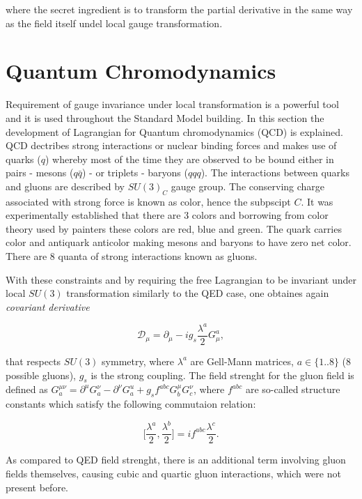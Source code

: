 where the secret ingredient is to transform the partial derivative in the same way as the field itself undel local gauge transformation.

\section{Quantum Chromodynamics}
Requirement of gauge invariance under local transformation is a powerful tool and it is used throughout the Standard Model building. In this section the development of Lagrangian for Quantum chromodynamics (QCD) is explained. QCD dectribes strong interactions or nuclear binding forces and makes use of quarks ($q$) whereby most of the time they are observed to be bound either in pairs - mesons ($q\bar{q}$) - or triplets - baryons ($qqq$). The interactions between quarks and gluons are described by $SU(3)_{C}$ gauge group. The conserving charge associated with strong force is known as color, hence the subpscipt $C$. It was experimentally established that there are 3 colors and borrowing from color theory used by painters these colors are red, blue and green. The quark carries color and antiquark anticolor making mesons and baryons to have zero net color. There are 8 quanta of strong interactions known as gluons.

With these constraints and by requiring the free Lagrangian to be invariant under local $SU(3)$ transformation similarly to the QED case, one obtaines again \textit{covariant derivative}

\begin{equation}
\mathcal{D}_{\mu} = \partial_{\mu} - ig_{s}\frac{\lambda^{a}}{2}G^{a}_{\mu},
\end{equation}

that respects $SU(3)$ symmetry, where $\lambda^{a}$ are Gell-Mann matrices, $a\in\{1..8\}$ (8 possible gluons), $g_{s}$ is the strong coupling. The field strenght for the gluon field is defined as $G_{a}^{\mu\nu}=\partial^{u}G_{a}^{\nu} - \partial^{\nu}G_{a}^{u} + g_{s}f^{abc}G_{b}^{\mu}G_{c}^{\nu}$, where $f^{abc}$ are so-called structure constants which satisfy the following commutaion relation:

\begin{equation}
	\Big[\frac{\lambda^{a}}{2},\frac{\lambda^{b}}{2}\Big] = if^{abc}\frac{\lambda^{c}}{2}.
\end{equation}

As compared to QED field strenght, there is an additional term involving gluon fields themselves, causing cubic and quartic gluon interactions, which were not present before.


